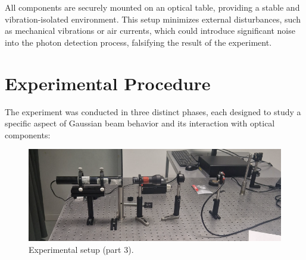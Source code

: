 \documentclass[prl,twocolumn]{revtex4-1}
\begin{document}
All components are securely mounted on an optical table, providing a stable and vibration-isolated environment. This setup minimizes external disturbances, such as mechanical vibrations or air currents, which could introduce significant noise into the photon detection process, falsifying the result of the experiment.

\section{Experimental Procedure}

The experiment was conducted in three distinct phases, each designed to study a specific aspect of Gaussian beam behavior and its interaction with optical components:

\begin{figure}[!b]
    \centering
    \includegraphics[width=\linewidth]{Images/setup.png}
    \caption{Experimental setup (part 3).}
    \label{fig:setup}
\end{figure}
\end{document}
